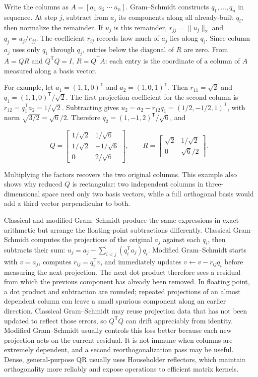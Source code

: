 Write the columns as \(A=[a_1\;a_2\;\cdots\;a_n]\). Gram--Schmidt constructs \(q_1,\ldots,q_n\) in sequence. At step \(j\), subtract from \(a_j\) its components along all already-built \(q_i\), then normalize the remainder. If \(u_j\) is this remainder, \(r_{jj}=\|u_j\|_2\) and \(q_j=u_j/r_{jj}\). The coefficient \(r_{ij}\) records how much of \(a_j\) lies along \(q_i\). Since column \(a_j\) uses only \(q_1\) through \(q_j\), entries below the diagonal of \(R\) are zero. From \(A=QR\) and \(Q^\mathsf TQ=I\), \(R=Q^\mathsf TA\): each entry is the coordinate of a column of \(A\) measured along a basis vector.

For example, let \(a_1=(1,1,0)^\mathsf T\) and \(a_2=(1,0,1)^\mathsf T\). Then \(r_{11}=\sqrt2\) and \(q_1=(1,1,0)^\mathsf T/\sqrt2\). The first projection coefficient for the second column is \(r_{12}=q_1^\mathsf Ta_2=1/\sqrt2\). Subtracting gives \(u_2=a_2-r_{12}q_1=(1/2,-1/2,1)^\mathsf T\), with norm \(\sqrt{3/2}=\sqrt6/2\). Therefore \(q_2=(1,-1,2)^\mathsf T/\sqrt6\), and

\[
Q=\begin{bmatrix}1/\sqrt2&1/\sqrt6\\1/\sqrt2&-1/\sqrt6\\0&2/\sqrt6\end{bmatrix},\qquad
R=\begin{bmatrix}\sqrt2&1/\sqrt2\\0&\sqrt6/2\end{bmatrix}.
\]

Multiplying the factors recovers the two original columns. This example also shows why reduced \(Q\) is rectangular: two independent columns in three-dimensional space need only two basis vectors, while a full orthogonal basis would add a third vector perpendicular to both.

Classical and modified Gram--Schmidt produce the same expressions in exact arithmetic but arrange the floating-point subtractions differently. Classical Gram--Schmidt computes the projections of the original \(a_j\) against each \(q_i\), then subtracts their sum: \(u_j=a_j-\sum_{i<j}(q_i^\mathsf Ta_j)q_i\). Modified Gram--Schmidt starts with \(v=a_j\), computes \(r_{ij}=q_i^\mathsf Tv\), and immediately updates \(v\leftarrow v-r_{ij}q_i\) before measuring the next projection. The next dot product therefore sees a residual from which the previous component has already been removed. In floating point, a dot product and subtraction are rounded; repeated projections of an almost dependent column can leave a small spurious component along an earlier direction. Classical Gram--Schmidt may reuse projection data that has not been updated to reflect those errors, so \(Q^\mathsf TQ\) can drift appreciably from identity. Modified Gram--Schmidt usually controls this loss better because each new projection acts on the current residual. It is not immune when columns are extremely dependent, and a second reorthogonalization pass may be useful. Dense, general-purpose QR usually uses Householder reflectors, which maintain orthogonality more reliably and expose operations to efficient matrix kernels.

